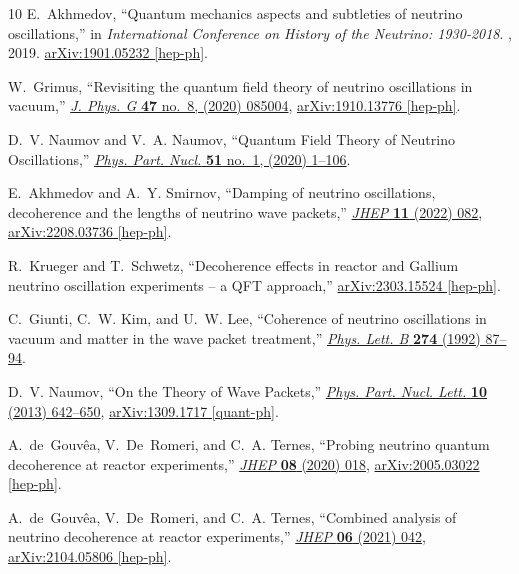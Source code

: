 \documentclass[aps, prd, onecolumn, tightenlines, notitlepage, superscriptaddress, nofootinbib, preprintnumbers, floatfix,showkeys,11pt]{revtex4-2}
\begin{document}
\begin{thebibliography}{10}
E.~Akhmedov, ``{Quantum mechanics aspects and subtleties of neutrino
  oscillations},'' in {\em {International Conference on History of the
  Neutrino}: {1930-2018}}.
, 2019.
\newblock \href{http://arxiv.org/abs/1901.05232}{{\ttfamily arXiv:1901.05232
  [hep-ph]}}.

W.~Grimus, ``{Revisiting the quantum field theory of neutrino oscillations in
  vacuum},'' \href{http://dx.doi.org/10.1088/1361-6471/ab716f}{{\em J. Phys. G}
  {\bfseries 47} no.~8, (2020) 085004},
  \href{http://arxiv.org/abs/1910.13776}{{\ttfamily arXiv:1910.13776
  [hep-ph]}}.

D.~V. Naumov and V.~A. Naumov, ``{Quantum Field Theory of Neutrino
  Oscillations},'' \href{http://dx.doi.org/10.1134/S1063779620010050}{{\em
  Phys. Part. Nucl.} {\bfseries 51} no.~1, (2020) 1--106}.

E.~Akhmedov and A.~Y. Smirnov, ``{Damping of neutrino oscillations, decoherence
  and the lengths of neutrino wave packets},''
  \href{http://dx.doi.org/10.1007/JHEP11(2022)082}{{\em JHEP} {\bfseries 11}
  (2022) 082}, \href{http://arxiv.org/abs/2208.03736}{{\ttfamily
  arXiv:2208.03736 [hep-ph]}}.

R.~Krueger and T.~Schwetz, ``{Decoherence effects in reactor and Gallium
  neutrino oscillation experiments -- a QFT approach},''
  \href{http://arxiv.org/abs/2303.15524}{{\ttfamily arXiv:2303.15524
  [hep-ph]}}.

C.~Giunti, C.~W. Kim, and U.~W. Lee, ``{Coherence of neutrino oscillations in
  vacuum and matter in the wave packet treatment},''
  \href{http://dx.doi.org/10.1016/0370-2693(92)90308-Q}{{\em Phys. Lett. B}
  {\bfseries 274} (1992) 87--94}.

D.~V. Naumov, ``{On the Theory of Wave Packets},''
  \href{http://dx.doi.org/10.1134/S1547477113070145}{{\em Phys. Part. Nucl.
  Lett.} {\bfseries 10} (2013) 642--650},
  \href{http://arxiv.org/abs/1309.1717}{{\ttfamily arXiv:1309.1717
  [quant-ph]}}.

A.~de~Gouvêa, V.~De~Romeri, and C.~A. Ternes, ``{Probing neutrino quantum
  decoherence at reactor experiments},''
  \href{http://dx.doi.org/10.1007/JHEP08(2020)049}{{\em JHEP} {\bfseries 08}
  (2020) 018}, \href{http://arxiv.org/abs/2005.03022}{{\ttfamily
  arXiv:2005.03022 [hep-ph]}}.

A.~de~Gouv\^ea, V.~De~Romeri, and C.~A. Ternes, ``{Combined analysis of
  neutrino decoherence at reactor experiments},''
  \href{http://dx.doi.org/10.1007/JHEP06(2021)042}{{\em JHEP} {\bfseries 06}
  (2021) 042}, \href{http://arxiv.org/abs/2104.05806}{{\ttfamily
  arXiv:2104.05806 [hep-ph]}}.


\end{thebibliography}
\end{document}
